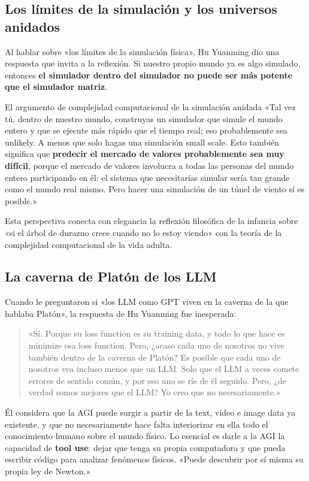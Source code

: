 \subsection{Los límites de la simulación y los universos anidados}

Al hablar sobre «los límites de la simulación física», Hu Yuanming dio una respuesta que invita a la reflexión. Si nuestro propio mundo ya es algo simulado, entonces \textbf{el simulador dentro del simulador no puede ser más potente que el simulador matriz}.

\begin{knowledgebox}{El argumento de complejidad computacional de la simulación anidada}
«Tal vez tú, dentro de nuestro mundo, construyas un simulador que simule el mundo entero y que se ejecute más rápido que el tiempo real; eso probablemente sea unlikely. A menos que solo hagas una simulación small scale. Esto también significa que \textbf{predecir el mercado de valores probablemente sea muy difícil}, porque el mercado de valores involucra a todas las personas del mundo entero participando en él: el sistema que necesitarías simular sería tan grande como el mundo real mismo. Pero hacer una simulación de un túnel de viento sí es posible.»
\end{knowledgebox}

Esta perspectiva conecta con elegancia la reflexión filosófica de la infancia sobre «si el árbol de durazno crece cuando no lo estoy viendo» con la teoría de la complejidad computacional de la vida adulta.

\subsection{La caverna de Platón de los LLM}

Cuando le preguntaron si «los LLM como GPT viven en la caverna de la que hablaba Platón», la respuesta de Hu Yuanming fue inesperada:

\begin{quote}
«Sí. Porque su loss function es su training data, y todo lo que hace es minimize esa loss function. Pero, ¿acaso cada uno de nosotros no vive también dentro de la caverna de Platón? Es posible que cada uno de nosotros vea incluso menos que un LLM. Solo que el LLM a veces comete errores de sentido común, y por eso uno se ríe de él seguido. Pero, ¿de verdad somos mejores que el LLM? Yo creo que no necesariamente.»
\end{quote}

Él considera que la AGI puede surgir a partir de la text, video e image data ya existente, y que no necesariamente hace falta interiorizar en ella todo el conocimiento humano sobre el mundo físico. Lo esencial es darle a la AGI la capacidad de \textbf{tool use}: dejar que tenga su propia computadora y que pueda escribir código para analizar fenómenos físicos. «Puede descubrir por sí misma su propia ley de Newton.»

